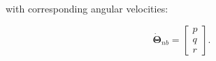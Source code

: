 with corresponding angular velocities:

\begin{equation}
	\dot{\bm{\Theta}}_{nb} =
	\begin{bmatrix}
		p \\ q \\ r
	\end{bmatrix}.
\end{equation}






